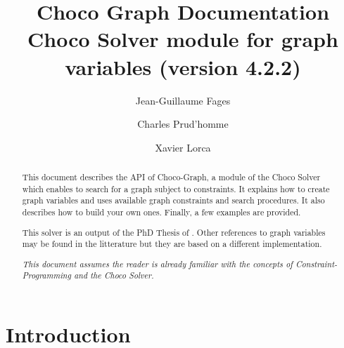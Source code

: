 \documentclass{article}
\begin{document}
\author[1]{Jean-Guillaume Fages}
\author[2]{Charles Prud'homme}
\author[2]{Xavier Lorca}
\title{Choco Graph Documentation \\ \large{Choco Solver module for graph variables (version 4.2.2)}}
\maketitle

\begin{abstract}
This document describes the API  of Choco-Graph, a module of the Choco Solver \cite{choco} which enables to search for a graph subject to constraints. 
It explains how to create graph variables and uses available graph constraints and search procedures. It also describes how to build your own ones. Finally, a few examples are provided.

This solver is an output of the PhD Thesis of \cite{FagesPhD,FagesPhDFr}. Other references to graph variables may be found in the litterature \cite{Beldiceanu00,LorcaBook11,ReginSlides04,QuesadaPhD,DoomsPhD} but they are based on a different implementation. 

\emph{This document assumes the reader is already familiar with the concepts of Constraint-Programming \cite{CPhandbook} and the Choco Solver.}
\end{abstract}

\newpage{}
{\scriptsize\tableofcontents{}}
\newpage{}

\newcommand{\GV}{\ensuremath{\mathcal{G}}}
\newcommand{\GLB}{\ensuremath{\underline{\mathcal{G}}}}
\newcommand{\GUB}{\ensuremath{\overline{\mathcal{G}}}}


\section{Introduction}
\end{document}
